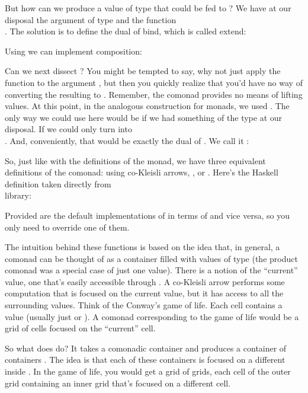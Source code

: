 But how can we produce a value of type  that could be fed
to ? We have at our disposal the argument of type
 and the function\\ .
The solution is to define the dual of bind, which is called extend:

Using  we can implement composition:

Can we next dissect ? You might be tempted to say, why
not just apply the function  to the
argument , but then you quickly realize that you'd have no
way of converting the resulting  to . Remember,
the comonad provides no means of lifting values. At this point, in the
analogous construction for monads, we used . The only way
we could use  here would be if we had something of the type
 at our disposal. If we could only turn 
into\\ . And, conveniently, that would be exactly the
dual of . We call it :

So, just like with the definitions of the monad, we have three
equivalent definitions of the comonad: using co-Kleisli arrows,
, or . Here's the Haskell definition
taken directly from\\  library:

Provided are the default implementations of  in terms of
 and vice versa, so you only need to override one of
them.

The intuition behind these functions is based on the idea that, in
general, a comonad can be thought of as a container filled with values
of type  (the product comonad was a special case of just one
value). There is a notion of the ``current'' value, one that's easily
accessible through . A co-Kleisli arrow performs some
computation that is focused on the current value, but it has access to
all the surrounding values. Think of the Conway's game of life. Each
cell contains a value (usually just  or ). A
comonad corresponding to the game of life would be a grid of cells
focused on the ``current'' cell.

So what does  do? It takes a comonadic container
 and produces a container of containers .
The idea is that each of these containers is focused on a different
 inside . In the game of life, you would get a
grid of grids, each cell of the outer grid containing an inner grid
that's focused on a different cell.

